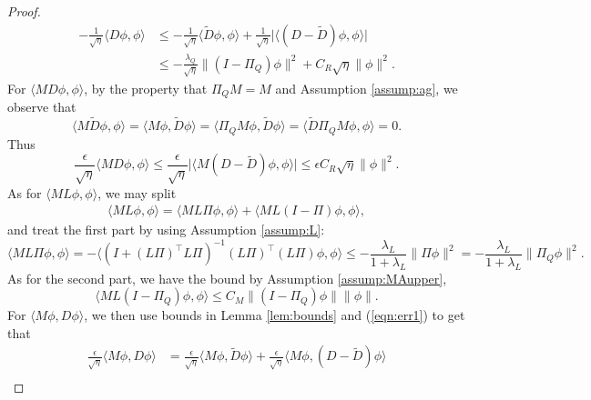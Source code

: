 \documentclass[11pt]{article}
\newcommand{\1}{\mathds{1}}
\begin{document}
\begin{proof}
\begin{equation}
\begin{aligned}
    -\frac{1}{\sqrt{\eta}}\langle   D \phi, \phi\rangle& \leq  -\frac{1}{\sqrt{\eta}}\langle  \tilde D \phi, \phi\rangle +\frac{1}{\sqrt{\eta}}\big|\langle (D - \tilde D)\phi, \phi\rangle \big|\\
    &\leq -\frac{\lambda_Q}{\sqrt{\eta}}\|(I-\Pi_Q)\phi\|^2+C_R \sqrt{\eta} \|\phi\|^2.
\end{aligned}
\end{equation}
For $\langle MD\phi, \phi\rangle$, by the property that $\Pi_Q M= M$ and Assumption \ref{assump:ag}, we observe that
\begin{equation}
   \langle M \tilde{D}\phi, \phi \rangle = \langle M\phi, \tilde{D}\phi\rangle = \langle \Pi_Q M\phi, \tilde{D}\phi\rangle=\langle \tilde{D} \Pi_Q M\phi, \phi\rangle = 0.
\end{equation}
Thus
\begin{equation}
    \frac{\epsilon}{\sqrt{\eta}}\langle MD\phi, \phi\rangle\leq \frac{\epsilon}{\sqrt{\eta}}\big|\langle M(D-\tilde{D})\phi, \phi\rangle\big|\leq \epsilon C_R\sqrt{\eta}\|\phi\|^2.
\end{equation}
As for $\langle M L\phi, \phi\rangle$, we may split
\begin{equation}
    \begin{aligned}
        \langle M L\phi, \phi\rangle = \langle M L\Pi\phi, \phi\rangle+ \langle M L(I-\Pi)\phi, \phi\rangle,
    \end{aligned}
\end{equation}
and treat the first part by using Assumption \ref{assump:L}:
\begin{equation}
    \langle M L\Pi\phi, \phi\rangle = -\langle( I+(L\Pi)^{\top} L\Pi)^{-1}(L\Pi)^{\top}(L\Pi)\phi, \phi\rangle \leq -\frac{\lambda_L}{1+\lambda_L} \|\Pi\phi\|^2 = -\frac{\lambda_L}{1+\lambda_L} \|\Pi_Q\phi\|^2.
\end{equation}
As for the second part, we have the bound  by  Assumption \ref{assump:MAupper},
\begin{equation}
     \langle M L(I-\Pi_Q)\phi, \phi\rangle\leq C_M \|(I-\Pi_Q)\phi\|\|\phi\|.
\end{equation}
For $\langle M\phi, D\phi\rangle$, we then use bounds in Lemma \ref{lem:bounds} and (\ref{eqn:err1}) to get that
\begin{equation}
\begin{aligned}
   \frac{\epsilon}{\sqrt{\eta}} \langle M\phi, D\phi\rangle&=\frac{\epsilon}{\sqrt{\eta}} \langle M\phi, \tilde{D}\phi\rangle+\frac{\epsilon}{\sqrt{\eta}} \langle M\phi, (D-\tilde{D})\phi\rangle\\

\end{aligned}
\end{equation}
\end{proof}
\end{document}
